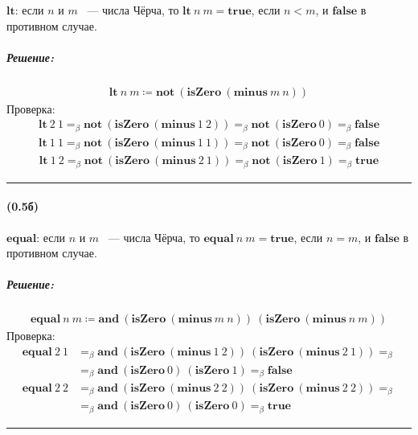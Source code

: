 \documentclass{article}
\newenvironment{proof}{\subparagraph{\hspace{-1em}Решение:\newline}\-}{\par\noindent\rule{\textwidth}{0.4pt}}
\newcommand{\term}[1]{\mathbf{#1}}
\newcommand{\eqbeta}{=_\beta}
\begin{document}
    $\term{lt}$: если $n$ и $m$ ~--- числа Чёрча, то $\term{lt}~n~m = \term{true}$, если $n < m$, и $\term{false}$ в противном случае.

    \begin{proof}
        \begin{gather}
            \term{lt}~n~m \coloneqq \term{not}~(\term{isZero}~(\term{minus}~m~n))
        \end{gather}
        Проверка:
        \begin{align}
            \term{lt}~2~1 \eqbeta \term{not}~(\term{isZero}~(\term{minus}~1~2)) \eqbeta \term{not}~(\term{isZero}~0) \eqbeta \term{false}
        \end{align}
        \begin{align}
            \term{lt}~1~1 \eqbeta \term{not}~(\term{isZero}~(\term{minus}~1~1)) \eqbeta \term{not}~(\term{isZero}~0) \eqbeta \term{false}
        \end{align}
        \begin{align}
            \term{lt}~1~2 \eqbeta \term{not}~(\term{isZero}~(\term{minus}~2~1)) \eqbeta \term{not}~(\term{isZero}~1) \eqbeta \term{true}
        \end{align}
    \end{proof}

    \paragraph{(0.5б)}

    $\term{equal}$: если $n$ и $m$ ~--- числа Чёрча, то $\term{equal}~n~m = \term{true}$, если $n = m$, и $\term{false}$ в противном случае.

    \begin{proof}
        \begin{gather}
            \term{equal}~n~m \coloneqq \term{and}~(\term{isZero}~(\term{minus}~m~n))~(\term{isZero}~(\term{minus}~n~m))
        \end{gather}
        Проверка:
        \begin{align}
            \term{equal}~2~1 & \eqbeta \term{and}~(\term{isZero}~(\term{minus}~1~2))~(\term{isZero}~(\term{minus}~2~1)) \eqbeta \\
                             & \eqbeta \term{and}~(\term{isZero}~0)~(\term{isZero}~1) \eqbeta \term{false}
        \end{align}
        \begin{align}
            \term{equal}~2~2 & \eqbeta \term{and}~(\term{isZero}~(\term{minus}~2~2))~(\term{isZero}~(\term{minus}~2~2)) \eqbeta \\
                             & \eqbeta \term{and}~(\term{isZero}~0)~(\term{isZero}~0) \eqbeta \term{true}
        \end{align}
    \end{proof}
\end{document}
